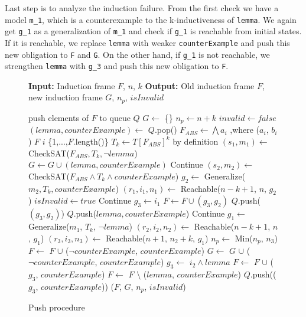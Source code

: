 Last step is to analyze the induction failure. From the first check we have a model \texttt{m\_1}, which is a counterexample to the k-inductiveness of \texttt{lemma}. We again get \texttt{g\_1} as a generalization of \texttt{m\_1} and check if \texttt{g\_1} is reachable from initial states. If it is reachable, we replace \texttt{lemma} with weaker \texttt{\neg counterExample} and push this new obligation to \texttt{F} and \texttt{G}. On the other hand, if \texttt{g\_1} is not reachable, we strengthen \texttt{lemma} with \texttt{g\_3} and push this new obligation to \texttt{F}.
\begin{figure}[H]
\begin{mdframed}
\begin{algorithmic}[1]
\State \textbf{Input:} Induction frame $F$, $n$, $k$
\State \textbf{Output:} Old induction frame $F$, new induction frame $G$, $n_p$, $isInvalid$ 

\State push elements of $F$ to queue $Q$
    \State $G \gets$ \{\}
    \State $n_p \gets n + k$
    \State $invalid \gets false$
        \State $(lemma, counterExample)  \gets$ $Q$.pop()
        \State $F_{ABS} \gets \bigwedge a_i$ ,where ($a_i$, $b_i$) \in $F$ \forall $i$ \in \{1,...,$F$.length()\}
        \State $T_k \gets T[F_{ABS}]^k$ by definition
        \State $(s_1, m_1) \gets$ CheckSAT($F_{ABS}, T_k, \neg lemma$)
            \State $G \gets G \cup (lemma, counterExample)$
            \State Continue
        \EndIf
        \State $(s_2, m_2) \gets$ CheckSAT($F_{ABS} \wedge T_k \wedge counterExample$)
            \State $ g_2 \gets $ Generalize($m_2, T_k, counterExample$)
            \State $(r_1, i_1, n_1) \gets $ Reachable($n-k+1$, $n$, $g_2$)
                \State $ isInvalid \gets true $
                \State Continue
            \Else
                \State $g_3 \gets i_1$
                \State $F \gets F \cup (g_3, g_2)$
                \State $Q$.push($(g_3, g_2)$)
                \State $Q$.push($lemma, counterExample$)
                \State Continue
            \EndIf
        \EndIf
        \State $g_1 \gets$ Generalize($m_1$, $T_k$, $\neg lemma$)
        \State $(r_2, i_2, n_2) \gets $ Reachable($n-k+1$, $n$, $g_1$)
            \State $(r_3, i_3, n_3) \gets $ Reachable($n+1$, $n_2 + k$, $g_1$)
            \State $n_p \gets $ Min($n_p$, $n_3$)
            \State $F \gets$ $F$ $\cup $ ($\neg counterExample$, $counterExample$)
            \State $G \gets$ $G$ $\cup $ ($\neg counterExample$, $counterExample$)
        \Else
            \State $g_3 \gets$ $i_2 \wedge lemma$
            \State $F \gets$ $F$ $\cup $ ($g_3$, $counterExample$)
            \State $F \gets$ $F$ $\setminus $ ($lemma$, $counterExample$)
            \State $Q$.push(($g_3$, $counterExample$))
        \EndIf
        \State \Return ($F$, $G$, $n_p$, $isInvalid$)
    \EndWhile
        
\end{algorithmic}
\end{mdframed}
\caption{Push procedure}\label{alg:3}
\end{figure}


